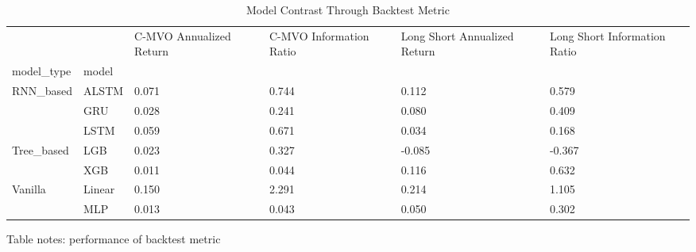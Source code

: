 \documentclass[10pt,letterpaper]{article}
\begin{document}
\begin{table}[!ht]
\centering
\caption{Model Contrast Through Backtest Metric}
\begin{tabular}{llp{1.5cm}p{1.5cm}p{1.5cm}p{1.5cm}}
\toprule
        &     &  C-MVO Annualized Return &  C-MVO Information Ratio &  Long Short Annualized Return &  Long Short Information Ratio \\
model\_type & model &                          &                          &                               &                               \\
\midrule
RNN\_based & ALSTM &                    0.071 &                    0.744 &                         0.112 &                         0.579 \\
        & GRU &                    0.028 &                    0.241 &                         0.080 &                         0.409 \\
        & LSTM &                    0.059 &                    0.671 &                         0.034 &                         0.168 \\
Tree\_based & LGB &                    0.023 &                    0.327 &                        -0.085 &                        -0.367 \\
        & XGB &                    0.011 &                    0.044 &                         0.116 &                         0.632 \\
Vanilla & Linear &                    0.150 &                    2.291 &                         0.214 &                         1.105 \\
        & MLP &                    0.013 &                    0.043 &                         0.050 &                         0.302 \\
\bottomrule
\end{tabular}




\begin{flushleft}
Table notes: performance of backtest metric
\end{flushleft}
\label{table1}

\end{table}
\end{document}

